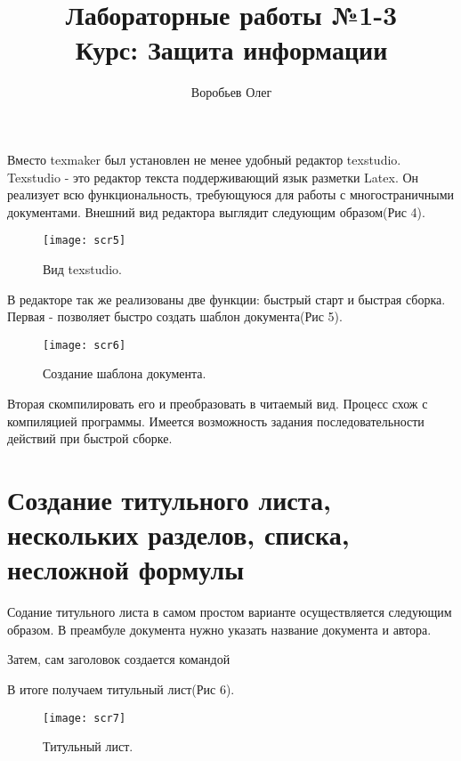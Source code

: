 \documentclass[a4paper,12pt]{article}
\begin{document}
Вместо texmaker был установлен не менее удобный редактор texstudio. Texstudio - это редактор текста поддерживающий язык разметки Latex. Он реализует всю функциональность, требующуюся для работы с многостраничными документами. Внешний вид редактора выглядит следующим образом(Рис 4).
\begin{figure}
	\center
	\texttt{[image: scr5]}
	\caption{Вид texstudio.}
\end{figure}

В редакторе так же реализованы две функции: быстрый старт и быстрая сборка. Первая - позволяет быстро создать шаблон документа(Рис 5).
\begin{figure}
	\center
	\texttt{[image: scr6]}
	\caption{Создание шаблона документа.}
\end{figure}

Вторая скомпилировать его и преобразовать в читаемый вид. Процесс схож с компиляцией программы. Имеется возможность задания последовательности действий при быстрой сборке.



\section[4]{Создание титульного листа, нескольких разделов, списка, несложной формулы}

Содание титульного листа в самом простом варианте осуществляется следующим образом.
В преамбуле документа нужно указать название документа и автора.
\begin{verbatim*}
	\title{Лабораторные работы №1-3 \\ Курс: Защита информации}
	\author{Воробьев Олег}	
\end{verbatim*}
Затем, сам заголовок создается командой
\begin{verbatim*}
	\maketitle
\end{verbatim*}

В итоге получаем титульный лист(Рис 6).
\begin{figure}
	\center
	\texttt{[image: scr7]}
	\caption{Титульный лист.}
\end{figure}
\end{document}
